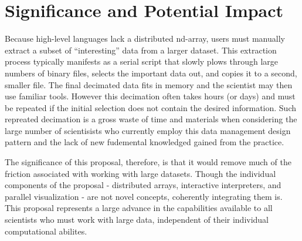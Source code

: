 \documentclass[letterpaper,12pt]{article}
\begin{document}





\section*{Significance and Potential Impact}

Because high-level languages lack a distributed nd-array, users must manually extract a subset
 of ``interesting'' data from a larger dataset.  This extraction process typically manifests 
as a serial script that slowly plows through large numbers of binary files, selects the 
important data out, and copies it to a second, smaller file.  The final decimated data fits 
in memory and the scientist may then use familiar tools.   However this decimation often takes 
hours (or days) and must be repeated if the initial selection does not contain the desired 
information.  Such repreated decimation is a gross waste of time and materials when considering 
the large number of scientisists who currently employ this data management design pattern and
the lack of new fudemental knowledged gained from the practice.

The significance of this proposal, therefore, is that it would remove much of the friction 
associated with working with large datasets.  Though the individual components of the 
proposal - distributed arrays, interactive interpreters, and parallel visualization - are 
not novel concepts, coherently integrating them is.  This proposal represents a large 
advance in the capabilities available to all scientists who must work with large data, 
independent of their individual computational abilites.
\end{document}
